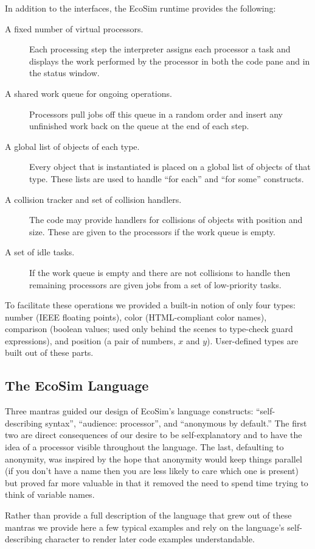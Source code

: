 \documentclass{sig-alternate}
\newcommand{\EcoSim}{EcoSim}
\begin{document}
In addition to the interfaces, the \EcoSim{} runtime provides the following:
\begin{description}
	\item[A fixed number of virtual processors.]
		Each processing step the interpreter assigns each processor a task
		and displays the work performed by the processor 
		in both the code pane and in the status window.
	\item[A shared work queue for ongoing operations.]
		Processors pull jobs off this queue in a random order
		and insert any unfinished work back on the queue at the end of each step.
	\item[A global list of objects of each type.]
		Every object that is instantiated is placed on a global list of objects of that type.
		These lists are used to handle ``for each'' and ``for some'' constructs.
	\item[A collision tracker and set of collision handlers.]
		The code may provide handlers for collisions of objects with position and size.
		These are given to the processors if the work queue is empty.
	\item[A set of idle tasks.]
		If the work queue is empty and there are not collisions to handle
		then remaining processors are given jobs from a set of low-priority tasks.
\end{description}
To facilitate these operations
we provided a built-in notion of only four types:
number (IEEE floating points), color (HTML-compliant color names), 
comparison (boolean values; used only behind the scenes to type-check guard expressions),
and position (a pair of numbers, $x$ and $y$).
User-defined types are built out of these parts.


\subsection{The \EcoSim{} Language}
Three mantras guided our design of \EcoSim{}'s language constructs:
``self-describing syntax'', ``audience: processor'', and ``anonymous by default.''
The first two are direct consequences of our desire to be self-explanatory 
and to have the idea of a processor visible throughout the language.
The last, defaulting to anonymity,
was inspired by the hope that anonymity would keep things parallel 
(if you don't have a name then you are less likely to care which one is present)
but proved far more valuable in that it removed the need 
to spend time trying to think of variable names.

Rather than provide a full description of the language that grew out of these mantras
we provide here a few typical examples
and rely on the language's self-describing character 
to render later code examples understandable.
\end{document}
